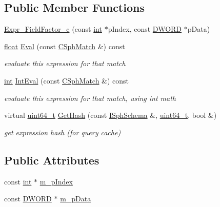 \subsection*{Public Member Functions}
\begin{DoxyCompactItemize}
\item 
\hyperlink{structExpr__FieldFactor__c_3_01bool_01_4_a7e889cf43d05d5024c952e2ad5c1d069}{Expr\-\_\-\-Field\-Factor\-\_\-c} (const \hyperlink{sphinxexpr_8cpp_a4a26e8f9cb8b736e0c4cbf4d16de985e}{int} $\ast$p\-Index, const \hyperlink{sphinxstd_8h_a798af1e30bc65f319c1a246cecf59e39}{D\-W\-O\-R\-D} $\ast$p\-Data)
\item 
\hyperlink{sphinxexpr_8cpp_a0e0d0739f7035f18f949c2db2c6759ec}{float} \hyperlink{structExpr__FieldFactor__c_3_01bool_01_4_a077383631e708dbfcd4fd1e74a87367d}{Eval} (const \hyperlink{classCSphMatch}{C\-Sph\-Match} \&) const 
\begin{DoxyCompactList}\small\item\em evaluate this expression for that match \end{DoxyCompactList}\item 
\hyperlink{sphinxexpr_8cpp_a4a26e8f9cb8b736e0c4cbf4d16de985e}{int} \hyperlink{structExpr__FieldFactor__c_3_01bool_01_4_aee0d087a65eb442f6bcf96de9d36d0b2}{Int\-Eval} (const \hyperlink{classCSphMatch}{C\-Sph\-Match} \&) const 
\begin{DoxyCompactList}\small\item\em evaluate this expression for that match, using int math \end{DoxyCompactList}\item 
virtual \hyperlink{sphinxstd_8h_aaa5d1cd013383c889537491c3cfd9aad}{uint64\-\_\-t} \hyperlink{structExpr__FieldFactor__c_3_01bool_01_4_a795d81300fabb566118fbf60be0f9531}{Get\-Hash} (const \hyperlink{classISphSchema}{I\-Sph\-Schema} \&, \hyperlink{sphinxstd_8h_aaa5d1cd013383c889537491c3cfd9aad}{uint64\-\_\-t}, bool \&)
\begin{DoxyCompactList}\small\item\em get expression hash (for query cache) \end{DoxyCompactList}\end{DoxyCompactItemize}
\subsection*{Public Attributes}
\begin{DoxyCompactItemize}
\item 
const \hyperlink{sphinxexpr_8cpp_a4a26e8f9cb8b736e0c4cbf4d16de985e}{int} $\ast$ \hyperlink{structExpr__FieldFactor__c_3_01bool_01_4_a40a1ecdb9d58d467e0c4e565aa9e82bb}{m\-\_\-p\-Index}
\item 
const \hyperlink{sphinxstd_8h_a798af1e30bc65f319c1a246cecf59e39}{D\-W\-O\-R\-D} $\ast$ \hyperlink{structExpr__FieldFactor__c_3_01bool_01_4_ae91e853d2358688cd7f55034fedfc12e}{m\-\_\-p\-Data}
\end{DoxyCompactItemize}
